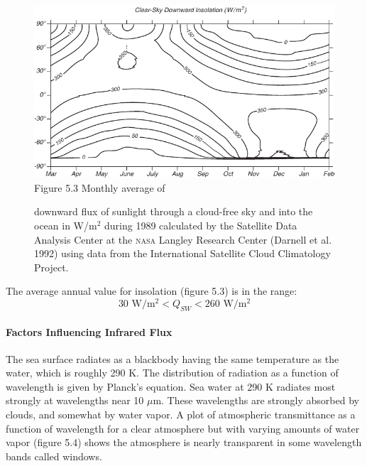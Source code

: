 \begin{figure}[t!]
\includegraphics{pics/QswDown}
\footnotesize
Figure 5.3 Monthly average of \rule{0pt}{3ex}downward flux of sunlight
through a cloud-free sky and into the ocean in W/m$^2$ during 1989
calculated by the Satellite Data Analysis Center at the \textsc{nasa}
Langley Research Center (Darnell et al. 1992) using data from the
International Satellite Cloud Climatology Project.
\label{fig:QswDown}
\vspace{-3ex}
\end{figure}

The average annual value for insolation (figure 5.3) is in the range:
\begin{equation}
30 \text{\ W/m$^2$} < Q_{SW} < 260 \text{\ W/m$^2$}
\end{equation}

\paragraph{Factors Influencing Infrared Flux}
The sea surface radiates as a
blackbody having the same temperature as the water, which is roughly
290 K. The distribution of radiation as a function of wavelength is
given by Planck's equation. Sea water at 290 K radiates most strongly
at wavelengths near 10 $\mu$m. These wavelengths are strongly absorbed
by clouds, and somewhat by water vapor. A plot of atmospheric
transmittance as a function of wavelength for a clear atmosphere but
with varying amounts of water vapor (figure 5.4) shows the atmosphere
is nearly transparent in some wavelength bands called windows.

